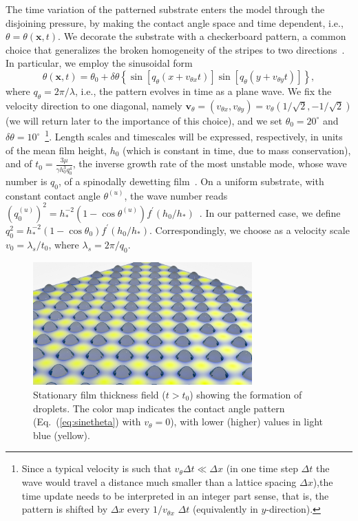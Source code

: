 The time variation of the patterned substrate enters the model through the disjoining pressure, by making the contact angle space and time dependent, i.e.,~$\theta = \theta(\mathbf{x},t)$.
We decorate the substrate with a checkerboard pattern, a common choice that generalizes the broken homogeneity of the stripes to two directions~\cite{jalaliFabricationCharacterizationScalable2018, nagayamaIntermediateWettingState2020, dasSurfacedirectedSpinodalDecomposition2020}.
In particular, we employ the sinusoidal form
\begin{equation}\label{eq:sinetheta}
   \!\! \theta(\mathbf{x},t) = \theta_0 + \delta\theta\left\{\sin\left[q_{\theta} (x+v_{\theta x}t)\right]\sin\left[q_{\theta}(y+v_{\theta y}t)\right]\right\},\! 
\end{equation}
where $q_{\theta} = 2\pi/\lambda$, i.e., the pattern evolves in time as a plane wave.
We fix the velocity direction to one diagonal, namely $\mathbf{v}_{\theta} = (v_{\theta x},v_{\theta y}) = v_{\theta}(1/\sqrt{2},-1/\sqrt{2})$ (we will return later to the importance of this choice), and we set $\theta_0 = 20^{\circ}$ and $\delta\theta=10^{\circ}$~\footnote{Since a typical velocity is such that $v_{\theta} \Delta t \ll \Delta x$ (in one time step $\Delta t$ the wave would travel a distance much smaller than a lattice spacing $\Delta x$),the time update needs to be interpreted in an integer part sense, that is, the pattern is shifted by $\Delta x$ every $1/v_{\theta x}$ $\Delta t$ (equivalently in $y$-direction).}.
Length scales and timescales will be expressed, respectively, in units of the mean film height, $h_0$ (which is constant in time, due to mass conservation), and of $t_0 = \frac{3\mu}{\gamma h_0^3 q_0^4}$, the inverse growth rate of the most unstable mode, whose wave number is $q_0$, of a spinodally dewetting film~\cite{meckeThermalFluctuationsThin2005}. 
On a uniform substrate, with constant contact angle $\theta^{(u)}$, the wave number reads $(q^{(u)}_0)^2 = h_{\ast}^{-2}(1-\cos \theta^{(u)})f^{\prime}(h_0/h_{\ast})$~\cite{meckeThermalFluctuationsThin2005, zhangMolecularSimulationThin2019}. 
In our patterned case, we define $q_0^2=h_{\ast}^{-2}(1-\cos\theta_0)f^{\prime}(h_0/h_{\ast})$. 
Correspondingly, we choose as a velocity scale $v_0 = \lambda_s/t_0$, where $\lambda_s = 2\pi/q_0$.
\begin{figure}
    \centering
    \includegraphics[width=0.75\textwidth]{graphics/Figure_1.png}
    \caption{Stationary film thickness field ($t>t_0$) showing the formation of droplets. The color map indicates the contact angle pattern (Eq.~(\ref{eq:sinetheta}) with $v_{\theta}=0$), with lower (higher) values in light blue (yellow).
    }
    \label{fig:handtheta}
\end{figure}
